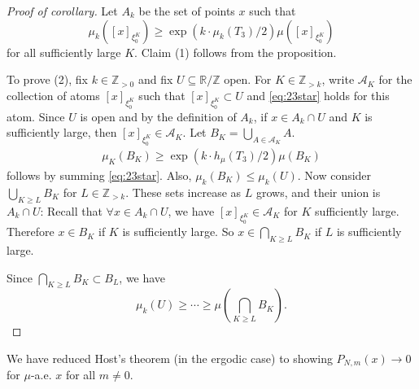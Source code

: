 \documentclass{article}
\begin{document}
\begin{proof}[Proof of corollary]
  Let $A_k$ be the set of points $x$ such that
  \begin{equation*}
    \mu_k([x]_{\xi_0^K}) \geq \exp(k \cdot \mu_k(T_3)/2) \mu([x]_{\xi_0^K}) \tag*{$(*)$} \label{eq:23star}
  \end{equation*}
  for all sufficiently large $K$.
  Claim (1) follows from the proposition.

  To prove (2), fix $k \in \mathbb{Z}_{>0}$ and fix $U \subseteq \mathbb{R}/\mathbb{Z}$ open.
  For $K \in \mathbb{Z}_{>k}$, write $\mathcal{A}_K$ for the collection of atoms $[x]_{\xi_0^K}$ such that $[x]_{\xi_0^K} \subset U$ and \eqref{eq:23star} holds for this atom.
  Since $U$ is open and by the definition of $A_k$, if $x \in A_k \cap U$ and $K$ is sufficiently large, then $[x]_{\xi_0^K} \in \mathcal{A}_K$.
  Let $B_K = \bigcup_{A \in \mathcal{A}_K} A$.
  \begin{align*}
    \mu_K(B_K) \geq \exp(k \cdot h_\mu(T_3)/2)\mu(B_K)
  \end{align*}
  follows by summing \eqref{eq:23star}.
  Also, $\mu_k(B_K) \leq \mu_k(U)$.
  Now consider $\bigcup_{K \geq L} B_K$ for $L \in \mathbb{Z}_{>k}$.
  These sets increase as $L$ grows, and their union is $A_k \cap U$:
  Recall that $\forall x \in A_k \cap U$, we have $[x]_{\xi_0^K} \in \mathcal{A}_K$ for $K$ sufficiently large. Therefore $x \in B_K$ if $K$ is sufficiently large.
  So $x \in \bigcap_{K \geq L} B_K$ if $L$ is sufficiently large.

  Since $\bigcap_{K \geq L} B_K \subset B_L$, we have
  \begin{equation*}
    \mu_k(U) \geq \dotsb \geq \mu(\bigcap_{K \geq L} B_K).
  \end{equation*}
\end{proof}

We have reduced Host's theorem (in the ergodic case) to showing $P_{N,m}(x) \to 0$ for $\mu$-a.e. $x$ for all $m \neq 0$.
\end{document}
